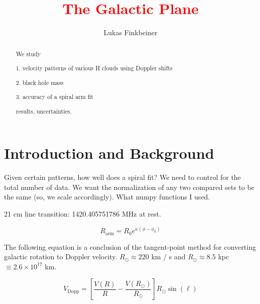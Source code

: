 \documentclass[12pt]{article}
\title{\textcolor{red}{The Galactic Plane}}
\author{Lukas Finkbeiner}
\begin{document}
\maketitle

\begin{abstract}


We study

1. velocity patterns of various H clouds using Doppler shifts

2. black hole mass

3. accuracy of a spiral arm fit

results, uncertainties.

\end{abstract}

\section{Introduction and Background}

Given certain patterns, how well does a spiral fit? We need to control for the total number of data. We want the normalization of any two compared sets to be the same (so, we scale accordingly). What numpy functions I used.

21 cm line transition: 1420.405751786 MHz at rest.

\begin{equation} \label{eq:spiral}
R_\text{arm} = R_0 e^{\kappa(\phi - \phi_0)}
\end{equation}

The following equation is a conclusion of the tangent-point method for converting galactic rotation to Doppler velocity. $R_\odot \approx 220 $ km / s and $R_\odot \approx 8.5$ kpc $\equiv 2.6 \times 10^{17}$ km. 

\begin{equation} \label{eq:vel_dopp}
V_\text{Dopp} = \left[ \frac{V(R)}{R} - \frac{V(R_\odot)}{R_\odot} \right] R_\odot \sin(\ell)
\end{equation}


\end{document}
